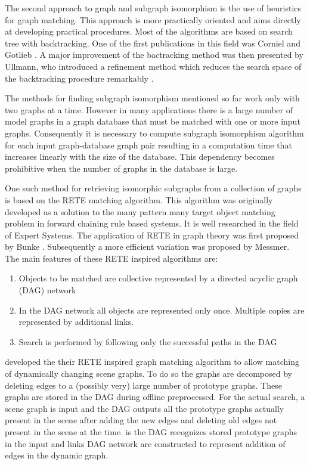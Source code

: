 The second approach to graph and subgraph isomorphism is the use of heuristics for graph matching. This approach is more practically oriented and aims 
directly at developing practical procedures. Most of the algorithms are based on search tree with backtracking. One of the first publications in this 
field was Corniel and Gotlieb \cite{corneil1970}. A major improvement of the bactracking method was then presented by Ullmann, who introduced  a refinement 
method which reduces the search space of the backtracking procedure remarkably \cite{ullmann1976}.

The methods for finding subgraph isomorphism mentioned so far work only with two graphs at a time. However in many applications there is a large number of model graphs in a graph database that must be matched with one or more input graphs. Consequently it is necessary to compute subgraph isomorphism algorithm for each input graph-database graph pair resulting in a computation time that increases linearly with the size of the database. This dependency becomes prohibitive when the number of graphs in the database is large.  

One such method for retrieving  isomorphic subgraphs from a collection of graphs is based on the RETE matching algorithm. This algorithm was originally developed as a solution to the many pattern many target object matching problem in forward chaining rule based systems. It is well researched in the field of Expert Systems. The application of RETE in graph theory was first proposed by Bunke \cite{bunke_glauser_tran1991}. Subsequently a more efficient variation was proposed by Messmer\cite{messmer_bunke2000}. The main features of these RETE inspired algorithms are: 

\begin{enumerate}
\item Objects to be matched are collective represented by a directed acyclic graph (DAG) network
\item In the DAG network  all objects are represented only once. Multiple copies are represented by additional links.
\item Search is performed by following only the successful paths in the DAG 
\end{enumerate}
 
\cite{bunke_glauser_tran1991} developed the their RETE inspired graph matching algorithm to allow matching of dynamically changing scene graphs. To do so the graphs are decomposed by deleting edges to a (possibly very) large number of prototype graphs. These graphs are stored in the DAG during offline preprocessed. For the actual search, a scene graph is input and the DAG outputs all the prototype graphs actually present in the scene after adding the new edges and deleting old edges not present in the scene at the time.
is the DAG recognizes stored prototype graphs in the input and  links  DAG network are constructed to represent addition of edges in the dynamic graph.



